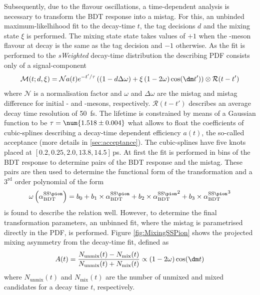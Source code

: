 Subsequently, due to the flavour oscillations, a time-dependent analysis is necessary to transform the BDT response into a mistag.
For this, an unbinded maximum-likelhihood fit to the decay-time $t$, the tag decisions $d$ and the mixing state $\xi$ is performed.
The mixing state state takes values of $+1$ when the \B-meson flavour at decay is the same as the tag decision and $-1$ otherwise.
As the fit is performed to the \emph{sWeighted} decay-time distribution the describing PDF consists only of a signal-component
\begin{equation}
\mathcal{M}(t;d,\xi)=\mathcal{N}a(t)e^{-t'/\tau}\left(\left(1-d\Delta\omega\right)+\xi\left(1-2\omega\right)\cos\!\left(\dm t'\right)\right)\otimes\mathcal{R}(t-t')\label{eq:mixPDF}
\end{equation}
where $\mathcal{N}$ is a normalisation factor and $\omega$ and $\Delta\omega$ are the mistag and mistag difference for initial \Bz- and \Bzb-mesons, respectively.
$\mathcal{R}(t-t')$ describes an average decay time resolution of \SI{50}{\femto\second}.
The lifetime is constrained by means of a Gaussian function to be $\tau=\num{1.518\pm0.004}$ what allows to float the coefficients of cubic-splines describing a decay-time dependent efficiency $a(t)$, the so-called acceptance (more details in \cref{sec:acceptance}).
The cubic-splines have five knots placed at $[0.2, 0.25, 2.0, 13.8, 14.5]\,$\si{\pico\second}.
At first the fit is performed in bins of the BDT response to determine pairs of the BDT response and the mistag.
These pairs are then used to determine the functional form of the transformation and a $3^{\text{rd}}$ order polynomial of the form
\begin{equation}
\omega\left(\alpha^{\text{SS}\pion}_\text{BDT}\right)=b_0+b_1\times\alpha^{\text{SS}\pion}_\text{BDT}+b_2\times{\alpha^{\text{SS}\pion}_\text{BDT}}^2+b_3\times{\alpha^{\text{SS}\pion}_\text{BDT}}^3\label{eq:tranformfunc}
\end{equation}
is found to describe the relation well.
However, to determine the final transformation parameters, an unbinned fit, where the mistag is parametrised directly in the PDF, is performed.
Figure \eqref{fig:MixingSSPion} shows the projected mixing asymmetry from the decay-time fit, defined as
\begin{equation}
A(t)=\frac{N_{\text{unmix}}(t)-N_{\text{mix}}(t)}{N_{\text{unmix}}(t)+N_{\text{mix}}(t)}\propto\left(1-2\omega\right)\cos\!\left(\dm t\right)
\end{equation}
where $N_{\text{unmix}}(t)$ and $N_{\text{mix}}(t)$ are the number of unmixed  and mixed \Bz candidates for a decay time $t$, respectively.
